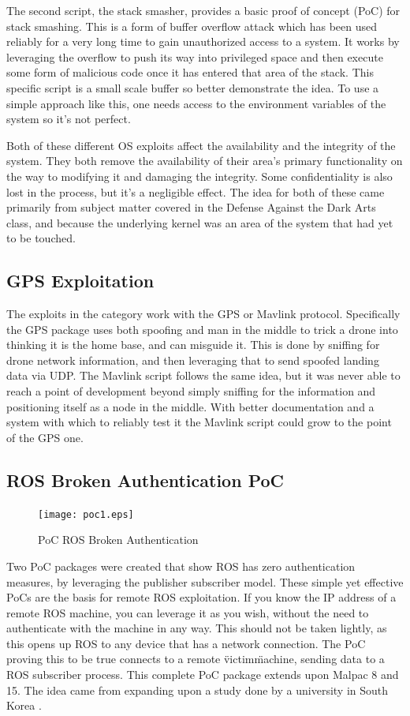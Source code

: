 \documentclass[IEEEtran,letterpaper,10pt,notitlepage,draftclsnofoot]{article}
\begin{document}
The second script, the stack smasher, provides a basic proof of concept (PoC) for stack smashing. \cite{SS}
This is a form of buffer overflow attack which has been used reliably for a very long time to gain unauthorized access to a system.
It works by leveraging the overflow to push its way into privileged space and then execute some form of malicious code once it has entered that area of the stack. \cite{SS2}
This specific script is a small scale buffer so better demonstrate the idea.
To use a simple approach like this, one needs access to the environment variables of the system so it's not perfect.

Both of these different OS exploits affect the availability and the integrity of the system.
They both remove the availability of their area's primary functionality on the way to modifying it and damaging the integrity.
Some confidentiality is also lost in the process, but it's a negligible effect.
The idea for both of these came primarily from subject matter covered in the Defense Against the Dark Arts class, and because the underlying kernel was an area of the system that had yet to be touched.

\subsection{GPS Exploitation}
The exploits in the category work with the GPS or Mavlink protocol.
Specifically the GPS package uses both spoofing and man in the middle to trick a drone into thinking it is the home base, and can misguide it.
This is done by sniffing for drone network information, and then leveraging that to send spoofed landing data via UDP.
The Mavlink script follows the same idea, but it was never able to reach a point of development beyond simply sniffing for the information and positioning itself as a node in the middle.
With better documentation and a system with which to reliably test it the Mavlink script could grow to the point of the GPS one.

\subsection{ROS Broken Authentication PoC}
\begin{figure}[H]
  \centering
    \texttt{[image: poc1.eps]}
    \caption{PoC ROS Broken Authentication}
\end{figure}

Two PoC packages were created that show ROS has zero authentication measures, by leveraging the publisher subscriber model.
These simple yet effective PoCs are the basis for remote ROS exploitation. If you know the IP address of a remote ROS machine, you can leverage it as you wish, without the need
to authenticate with the machine in any way. This should not be taken lightly, as this opens up ROS to any device that has a network connection. The PoC proving this to be true
connects to a remote \"victim\" machine, sending data to a ROS subscriber process. This complete PoC package extends upon Malpac 8 and 15. The idea came from expanding upon a study done by a university in South Korea \cite{ROSVulnCounter}.
\end{document}
